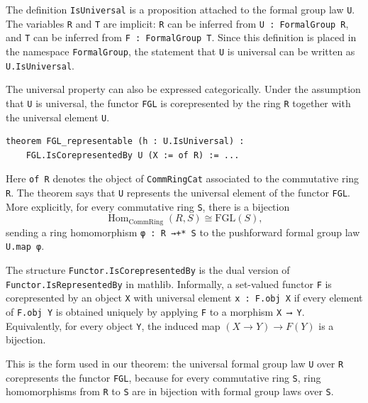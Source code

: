 The definition \lstinline|IsUniversal| is a proposition attached to the
formal group law \lstinline|U|.  The variables \lstinline|R| and
\lstinline|T| are implicit: \lstinline|R| can be inferred from
\lstinline|U : FormalGroup R|, and \lstinline|T| can be inferred from
\lstinline|F : FormalGroup T|.  Since this definition is placed in the
namespace \lstinline|FormalGroup|, the statement that \lstinline|U| is
universal can be written as \lstinline|U.IsUniversal|.

The universal property can also be expressed categorically.  Under the
assumption that \lstinline|U| is universal, the functor \lstinline|FGL| is
corepresented by the ring \lstinline|R| together with the universal
element \lstinline|U|.

\begin{lstlisting}
theorem FGL_representable (h : U.IsUniversal) :
    FGL.IsCorepresentedBy U (X := of R) := ...
\end{lstlisting}

Here \lstinline|of R| denotes the object of \lstinline|CommRingCat|
associated to the commutative ring \lstinline|R|.  The theorem says that
\lstinline|U| represents the universal element of the functor
\lstinline|FGL|.  More explicitly, for every commutative ring
\lstinline|S|, there is a bijection
\[
  \operatorname{Hom}_{\mathrm{CommRing}}(R,S)
  \cong
  \mathrm{FGL}(S),
\]
sending a ring homomorphism \lstinline|φ : R →+* S| to the pushforward
formal group law \lstinline|U.map φ|.

The structure \lstinline|Functor.IsCorepresentedBy| is the dual version
of \lstinline|Functor.IsRepresentedBy|
\href{https://leanprover-community.github.io/mathlib4_docs/Mathlib/CategoryTheory/RepresentedBy.html#CategoryTheory.Functor.IsRepresentedBy}{\faExternalLink}
in mathlib.  Informally, a set-valued functor \lstinline|F| is
corepresented by an object \lstinline|X| with universal element
\lstinline|x : F.obj X| if every element of \lstinline|F.obj Y| is
obtained uniquely by applying \lstinline|F| to a morphism
\lstinline|X ⟶ Y|.  Equivalently, for every object \lstinline|Y|, the
induced map
$(X \rightarrow Y) \rightarrow F(Y)$
is a bijection.

This is the form used in our theorem: the universal formal group law
\lstinline|U| over \lstinline|R| corepresents the functor \lstinline|FGL|,
because for every commutative ring \lstinline|S|, ring homomorphisms from
\lstinline|R| to \lstinline|S| are in bijection with formal group laws
over \lstinline|S|.


